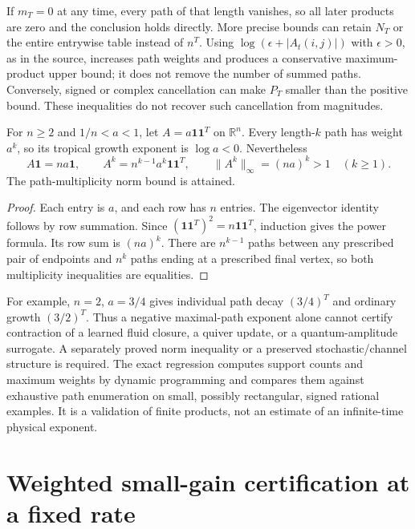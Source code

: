 If $m_T=0$ at any time, every path of that length vanishes, so all later
products are zero and the conclusion holds directly. More precise bounds
can retain $N_T$ or the entire entrywise table instead of $n^T$.
Using $\log(\epsilon+|A_t(i,j)|)$ with $\epsilon>0$, as in the source,
increases path weights and produces a conservative maximum-product upper
bound; it does not remove the number of summed paths. Conversely, signed
or complex cancellation can make $P_T$ smaller than the positive bound.
These inequalities do not recover such cancellation from magnitudes.

\begin{proposition}
\label{prop:tropical-branching-counterexample}
For $n\ge2$ and $1/n<a<1$, let $A=a\mathbf1\mathbf1^T$ on
$\mathbb R^n$. Every length-$k$ path has weight $a^k$, so its tropical
growth exponent is $\log a<0$. Nevertheless
\[
 A\mathbf1=na\mathbf1,\qquad
 A^k=n^{k-1}a^k\mathbf1\mathbf1^T,\qquad
 \|A^k\|_\infty=(na)^k>1 \quad(k\ge1).
\]
The path-multiplicity norm bound is attained.
\end{proposition}
\begin{proof}
Each entry is $a$, and each row has $n$ entries. The eigenvector identity
follows by row summation. Since
$(\mathbf1\mathbf1^T)^2=n\mathbf1\mathbf1^T$, induction gives the
power formula. Its row sum is $(na)^k$. There are $n^{k-1}$ paths between
any prescribed pair of endpoints and $n^k$ paths ending at a prescribed
final vertex, so both multiplicity inequalities are equalities.
\end{proof}

For example, $n=2$, $a=3/4$ gives individual path decay $(3/4)^T$ and
ordinary growth $(3/2)^T$. Thus a negative maximal-path exponent alone
cannot certify contraction of a learned fluid closure, a quiver update,
or a quantum-amplitude surrogate. A separately proved norm inequality
or a preserved stochastic/channel structure is required. The exact
regression computes support counts and maximum weights by dynamic
programming and compares them against exhaustive path enumeration on
small, possibly rectangular, signed rational examples. It is a validation
of finite products, not an estimate of an infinite-time physical exponent.

\section{Weighted small-gain certification at a fixed rate}

